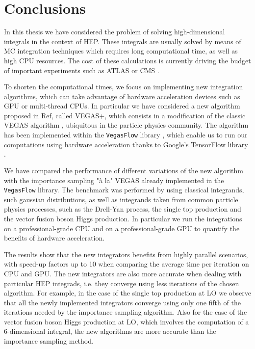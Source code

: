\documentclass[../main/main.tex]{subfiles}
\begin{document}
\chapter{Conclusions}

In this thesis we have considered the problem of solving high-dimensional integrals in the context of HEP.
These integrals are usually solved by means of MC integration techniques which requires long computational time, as well as high CPU resources.
The cost of these calculations is currently driving the budget of important experiments such as ATLAS or CMS \cite{Buckley:2019wov}.

To shorten the computational times, we focus on implementing new integration algorithms, which can take advantage of hardware acceleration devices such as GPU or multi-thread CPUs.
In particular we have considered a new algorithm proposed in Ref\cite{Lepage:2020tgj}, called VEGAS+,  which consists in a modification of the classic VEGAS algorithm \cite{Lepage:1977sw}, ubiquitous in the particle physics community.
The algorithm has been implemented within the \texttt{VegasFlow} library \cite{Carrazza:2020rdn}, which enable us to run our computations using hardware acceleration thanks to Google's TensorFlow library
\cite{tensorflow2015-whitepaper}. 

We have compared the performance of different variations of the new algorithm with the importance sampling "à la" VEGAS already implemented in the \texttt{VegasFlow} library. The benchmark was performed by using classical integrands, such gaussian distributions, as well as integrands taken from common particle physics processes, such as the Drell-Yan process, the single top production and the vector fusion boson Higgs production. In particular we run the integrations on a professional-grade CPU and on a professional-grade GPU to quantify the benefits of hardware acceleration.

The results show that the new integrators benefits from highly parallel scenarios, with speed-up factors up to 10 when comparing the average time per iteration on CPU and GPU. The new integrators are also more accurate when dealing with particular HEP integrads, i.e. they converge using less iterations of the chosen algorithm. For example, 
in the case of the single top production at LO we observe that all the newly implemented integrators converge using only one fifth of the iterations needed by the importance sampling algorithm. Also for the case of the vector fusion boson Higgs production at LO, which involves the computation of a 6-dimensional integral, the new algorithms are more accurate than the importance sampling method.
\end{document}
